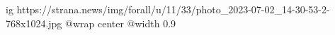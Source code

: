  
 
 
 
 

\ifcmt
  ig https://strana.news/img/forall/u/11/33/photo_2023-07-02_14-30-53-2-768x1024.jpg
  @wrap center
  @width 0.9
\fi
